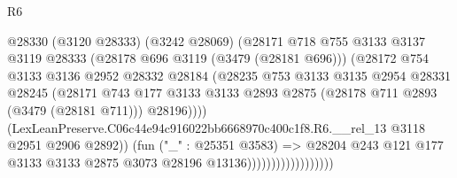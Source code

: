 \begin{lexlean}{R6}
\begin{coremodule}
                                      @28330
                                        (@3120 @28333)
                                        (@3242 @28069)
                                        (@28171
                                          @718
                                          @755
                                          @3133
                                          @3137
                                          @3119
                                          @28333
                                          (@28178 @696 @3119 (@3479 (@28181 @696)))
                                          (@28172
                                            @754
                                            @3133
                                            @3136
                                            @2952
                                            @28332
                                            @28184
                                            (@28235
                                              @753
                                              @3133
                                              @3135
                                              @2954
                                              @28331
                                              @28245
                                              (@28171
                                                @743
                                                @177
                                                @3133
                                                @3133
                                                @2893
                                                @2875
                                                (@28178 @711 @2893 (@3479 (@28181 @711)))
                                                @28196))))
                                        (LexLeanPreserve.C06c44e94c916022bb6668970c400c1f8.R6.__rel_13
                                          @3118
                                          @2951
                                          @2906
                                          @2892))
                                      (fun ("_" : @25351 @3583) =>
                                      @28204
                                        @243
                                        @121
                                        @177
                                        @3133
                                        @3133
                                        @2875
                                        @3073
                                        @28196
                                        @13136))))))))))))))))))

\end{coremodule}
\end{lexlean}
